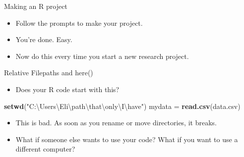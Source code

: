 \documentclass[ignorenonframetext,]{beamer}
\newenvironment{Shaded}{\begin{snugshade}}{\end{snugshade}}
\newcommand{\CharTok}[1]{\textcolor[rgb]{0.31,0.60,0.02}{#1}}
\newcommand{\KeywordTok}[1]{\textcolor[rgb]{0.13,0.29,0.53}{\textbf{#1}}}
\newcommand{\NormalTok}[1]{#1}
\newcommand{\StringTok}[1]{\textcolor[rgb]{0.31,0.60,0.02}{#1}}
\providecommand{\tightlist}{%
  \setlength{\itemsep}{0pt}\setlength{\parskip}{0pt}}
\begin{document}
\begin{frame}{Making an R project}
\protect\hypertarget{making-an-r-project-1}{}

\begin{itemize}
\item
  Follow the prompts to make your project.
\item
  You’re done. Easy.
\item
  Now do this \alert{every time} you start a new research project.
\end{itemize}

\end{frame}

\begin{frame}[fragile]{Relative Filepaths and here()}
\protect\hypertarget{relative-filepaths-and-here}{}

\begin{itemize}
\tightlist
\item
  Does your R code start with this?
\end{itemize}

\begin{Shaded}
\begin{Highlighting}[]
\KeywordTok{setwd}\NormalTok{(}\StringTok{"C:\textbackslash{}Users\textbackslash{}Eli\textbackslash{}path}\CharTok{\textbackslash{}t}\StringTok{hat\textbackslash{}only\textbackslash{}I\textbackslash{}have"}\NormalTok{)}
\NormalTok{mydata =}\StringTok{ }\KeywordTok{read.csv}\NormalTok{(data.csv)}
\end{Highlighting}
\end{Shaded}

\begin{itemize}
\item
  This is \alert{bad}. As soon as you rename or move directories, it
  breaks.
\item
  What if someone else wants to use your code? What if you want to use a
  different computer?
\end{itemize}

\end{frame}
\end{document}
